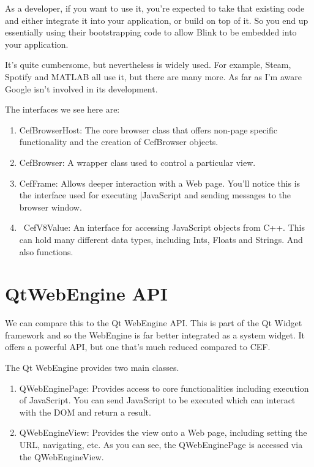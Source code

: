 \documentclass{article}
\begin{document}
As a developer, if you want to use it, you're expected to take that existing code and either integrate it into your application, or build on top of it. So you end up essentially using their bootstrapping code to allow Blink to be embedded into your application.

It's quite cumbersome, but nevertheless is widely used. For example, Steam, Spotify and MATLAB all use it, but there are many more. As far as I'm aware Google isn't involved in its development.

The interfaces we see here are:

\begin{enumerate}
\item {\code CefBrowserHost}: The core browser class that offers non-page specific functionality and the creation of {\code CefBrowser} objects.
\item {\code CefBrowser}: A wrapper class used to control a particular view.
\item {\code CefFrame}: Allows deeper interaction with a Web page. You'll notice this is the interface used for executing |JavaScript and sending messages to the browser window. 
\item {\ CefV8Value}: An interface for accessing JavaScript objects from C++. This can hold many different data types, including Ints, Floats and Strings. And also functions.
\end{enumerate}


\section{QtWebEngine API}

We can compare this to the Qt WebEngine API. This is part of the Qt Widget framework and so the WebEngine is far better integrated as a system widget. It offers a powerful API, but one that's much reduced compared to CEF.

The Qt WebEngine provides two main classes.

\begin{enumerate}
\item {\code QWebEnginePage}: Provides access to core functionalities including execution of JavaScript. You can send JavaScript to be executed which can interact with the DOM and return a result.
\item {\code QWebEngineView}: Provides the view onto a Web page, including setting the URL, navigating, etc. As you can see, the {\code QWebEnginePage} is accessed via the {\code QWebEngineView}.
\end{enumerate}
\end{document}
